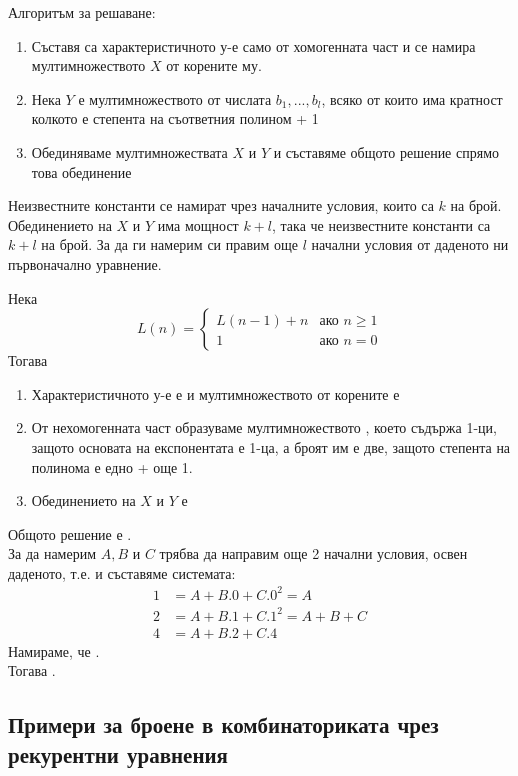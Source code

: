 Алгоритъм за решаване:
\begin{enumerate}
    \item Съставя са характеристичното у-е само от хомогенната част и се намира мултимножеството \(X\) от корените му.
    \item Нека \(Y\) е мултимножеството от числата \(b_1, ..., b_l\), всяко от които има кратност колкото 
    е степента на съответния полином + 1
    \item Обединяваме мултимножествата \(X\) и \(Y\) и съставяме общото решение спрямо това обединение
\end{enumerate}

Неизвестните константи се намират чрез началните условия, които са \(k\) на брой. Обединението на \(X\) и \(Y\)
има мощност \(k + l\), така че неизвестните константи са \(k + l\) на брой. За да ги намерим си правим още
\(l\) начални условия от даденото ни първоначално уравнение.

\begin{example}
    Нека 
    \begin{equation*}
        L(n) = 
        \begin{cases}
            L(n - 1) + n & \text{ако \(n \ge 1\)} \\
            1 & \text{ако \(n = 0\)}
        \end{cases}
    \end{equation*}
    Тогава 
    \begin{enumerate}
        \item Характеристичното у-е е  и мултимножеството от корените е 
        \item От нехомогенната част образуваме мултимножеството , което съдържа 1-ци, 
        защото основата на експонентата е 1-ца, а броят им е две, защото степента на полинома е едно + още 1.
        \item Обединението на \(X\) и \(Y\) е 
    \end{enumerate}
    Общото решение е . \\
    За да намерим \(A, B\) и \(C\) трябва да направим още 2 начални условия, освен даденото, т.е.
     и съставяме системата:
    \begin{align*}
        1 &= A + B.0 + C.0^2 = A \\
        2 &= A + B.1 + C.1^2 = A + B + C \\
        4 &= A + B.2 + C.4
    \end{align*}
    Намираме, че . \\
    Тогава .
\end{example}

\subsection*{Примери за броене в комбинаториката чрез рекурентни уравнения}